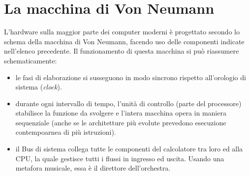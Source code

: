 \section{La macchina di Von Neumann}
L'hardware sulla maggior parte dei computer moderni è progettato secondo lo schema della macchina di Von Neumann, facendo uso delle componenti indicate nell'elenco precedente. Il funzionamento di questa macchina si può riassumere schematicamente:
\begin{itemize} [noitemsep, nolistsep]
	\item le fasi di elaborazione si susseguono in modo sincrono rispetto all'orologio di sistema (\textit{clock}).
	\item durante ogni intervallo di tempo, l’unità di controllo (parte del processore) stabilisce la funzione da svolgere e l’intera macchina opera in maniera sequenziale (anche se le architetture più evolute prevedono esecuzione contempoarnea di più istruzioni).
	\item il Bus di sistema collega tutte le componenti del calcolatore tra loro ed alla CPU, la quale gestisce tutti i flussi in ingresso ed uscita. Usando una metafora musicale, essa è il direttore dell'orchestra.
\end{itemize}

